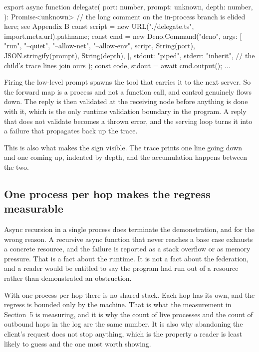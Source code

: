 \documentclass[11pt,a4paper]{article}
\begin{document}
\begin{code}
export async function delegate(
  port: number,
  prompt: unknown,
  depth: number,
): Promise<unknown> {
  // the long comment on the in-process branch is elided here; see Appendix B
  const script = new URL("./delegate.ts", import.meta.url).pathname;
  const cmd = new Deno.Command("deno", {
    args: [
      "run", "--quiet", "--allow-net", "--allow-env",
      script, String(port), JSON.stringify(prompt), String(depth),
    ],
    stdout: "piped",
    stderr: "inherit", // the child's trace lines join ours
  });
  const { code, stdout } = await cmd.output();
  ...
}
\end{code}

Firing the low-level prompt spawns the tool that carries it to the next server. So the
forward map is a process and not a function call, and control genuinely flows down.
The reply is then validated at the receiving node before anything is done with it,
which is the only runtime validation boundary in the program. A reply that does not
validate becomes a thrown error, and the serving loop turns it into a failure that
propagates back up the trace.

This is also what makes the sign visible. The trace prints one line going down and one
coming up, indented by depth, and the accumulation happens between the two.

\subsection{One process per hop makes the regress measurable}

Async recursion in a single process does terminate the demonstration, and for the
wrong reason. A recursive async function that never reaches a base case exhausts a
concrete resource, and the failure is reported as a stack overflow or as memory
pressure. That is a fact about the runtime. It is not a fact about the federation, and
a reader would be entitled to say the program had run out of a resource rather than
demonstrated an obstruction.

With one process per hop there is no shared stack. Each hop has its own, and the
regress is bounded only by the machine. That is what the measurement in Section~5 is
measuring, and it is why the count of live processes and the count of outbound hops in
the log are the same number. It is also why abandoning the client's request does not
stop anything, which is the property a reader is least likely to guess and the one
most worth showing.
\end{document}
